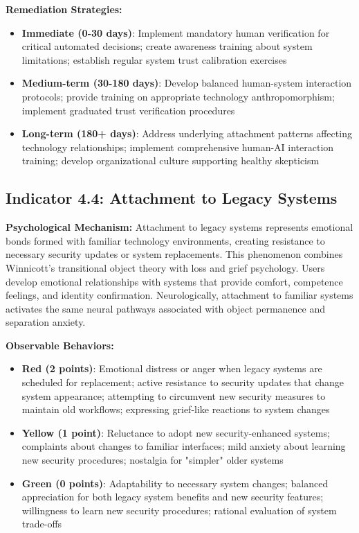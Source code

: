 \documentclass[11pt,a4paper]{article}
\begin{document}
\textbf{Remediation Strategies:}
\begin{itemize}
\item \textbf{Immediate (0-30 days)}: Implement mandatory human verification for critical automated decisions; create awareness training about system limitations; establish regular system trust calibration exercises
\item \textbf{Medium-term (30-180 days)}: Develop balanced human-system interaction protocols; provide training on appropriate technology anthropomorphism; implement graduated trust verification procedures
\item \textbf{Long-term (180+ days)}: Address underlying attachment patterns affecting technology relationships; implement comprehensive human-AI interaction training; develop organizational culture supporting healthy skepticism
\end{itemize}

\subsection{Indicator 4.4: Attachment to Legacy Systems}

\textbf{Psychological Mechanism:}
Attachment to legacy systems represents emotional bonds formed with familiar technology environments, creating resistance to necessary security updates or system replacements. This phenomenon combines Winnicott's transitional object theory\cite{winnicott1971} with loss and grief psychology. Users develop emotional relationships with systems that provide comfort, competence feelings, and identity confirmation. Neurologically, attachment to familiar systems activates the same neural pathways associated with object permanence and separation anxiety\cite{bowlby1969}.

\textbf{Observable Behaviors:}
\begin{itemize}
\item \textbf{Red (2 points)}: Emotional distress or anger when legacy systems are scheduled for replacement; active resistance to security updates that change system appearance; attempting to circumvent new security measures to maintain old workflows; expressing grief-like reactions to system changes
\item \textbf{Yellow (1 point)}: Reluctance to adopt new security-enhanced systems; complaints about changes to familiar interfaces; mild anxiety about learning new security procedures; nostalgia for "simpler" older systems
\item \textbf{Green (0 points)}: Adaptability to necessary system changes; balanced appreciation for both legacy system benefits and new security features; willingness to learn new security procedures; rational evaluation of system trade-offs
\end{itemize}
\end{document}
